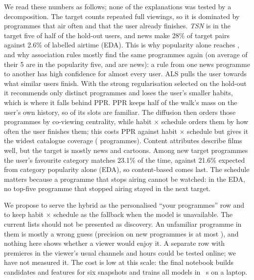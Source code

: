 \documentclass[conference]{IEEEtran}
\begin{document}
We read these numbers as follows; none of the explanations was tested by a decomposition. The target counts repeated full viewings, so it is dominated by programmes that air often and that the user already finishes. \emph{TSN} is in the target five of half of the hold-out users, and news make 28\% of target pairs against 2.6\% of labelled airtime (EDA). This is why popularity alone reaches \mapPop{}, and why association rules mostly find the same programmes again (on average  of their 5 are in the popularity five, and  are news): a rule from one news programme to another has high confidence for almost every user. ALS pulls the user towards what similar users finish. With the strong regularisation selected on the hold-out it recommends only \alsDistinct{} distinct programmes and loses the user's smaller habits, which is where it falls behind PPR. PPR keeps half of the walk's mass on the user's own history, so \pprWatched{} of its slots are familiar. The diffusion then orders those programmes by co-viewing centrality, while habit $\times$ schedule orders them by how often the user finishes them; this costs PPR against habit $\times$ schedule but gives it the widest catalogue coverage (\pprDistinct{} programmes). Content attributes describe films well, but the target is mostly news and cartoons. Among new target programmes the user's favourite category matches 23.1\% of the time, against 21.6\% expected from category popularity alone (EDA), so content-based comes last. The schedule matters because a programme that stops airing cannot be watched: in the EDA, no top-five programme that stopped airing stayed in the next target.

We propose to serve the hybrid as the personalised ``your programmes'' row and to keep habit $\times$ schedule as the fallback when the model is unavailable. The current lists should not be presented as discovery. An unfamiliar programme in them is mostly a wrong guess (precision on new programmes is at most \maxPrecNew), and nothing here shows whether a viewer would enjoy it. A separate row with premieres in the viewer's usual channels and hours could be tested online; we have not measured it. The cost is low at this scale: the final notebook builds candidates and features for six snapshots and trains all models in \finalRuntime~s on a laptop.
\end{document}
